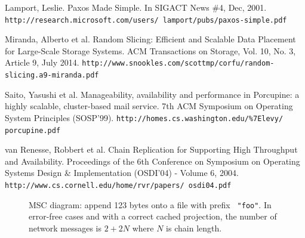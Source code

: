 \documentclass[preprint,10pt]{sigplanconf}
\begin{document}
\begin{thebibliography}{}
Lamport, Leslie.
Paxos Made Simple.
In SIGACT News \#4, Dec, 2001.
{\tt http://research.microsoft.com/users/ lamport/pubs/paxos-simple.pdf}

Miranda, Alberto et al.
Random Slicing: Efficient and Scalable Data Placement for Large-Scale Storage Systems.
ACM Transactions on Storage, Vol. 10, No. 3, Article 9, July 2014.
{\tt http://www.snookles.com/scottmp/corfu/random- slicing.a9-miranda.pdf}

Saito, Yasushi et al.
Manageability, availability and performance in Porcupine: a highly scalable, cluster-based mail service.
7th ACM Symposium on Operating System Principles (SOSP’99).
{\tt http://homes.cs.washington.edu/\%7Elevy/ porcupine.pdf}

van Renesse, Robbert et al.
Chain Replication for Supporting High Throughput and Availability.
Proceedings of the 6th Conference on Symposium on Operating Systems
Design \& Implementation (OSDI'04) - Volume 6, 2004.
{\tt http://www.cs.cornell.edu/home/rvr/papers/ osdi04.pdf}

\end{thebibliography}



\begin{figure}[tp]
\caption{MSC diagram: append 123 bytes onto a file with prefix {\tt
    "foo"}. In error-free cases and with a correct cached projection, the
  number of network messages is $2 + 2N$ where $N$ is chain length.}
\label{fig:append-flowMSC}
\end{figure}
\end{document}
